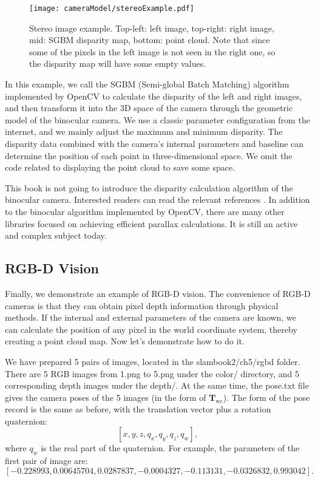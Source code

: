 \begin{figure}[!t]
    \centering
    \texttt{[image: cameraModel/stereoExample.pdf]}
    \caption{Stereo image example. Top-left: left image, top-right: right image, mid: SGBM disparity map, bottom: point cloud. Note that since some of the pixels in the left image is not seen in the right one, so the disparity map will have some empty values.}
    \label{fig:stereoExample}
\end{figure}

In this example, we call the SGBM (Semi-global Batch Matching) \textsuperscript{\cite{Hirschmuller2008}} algorithm implemented by OpenCV to calculate the disparity of the left and right images, and then transform it into the 3D space of the camera through the geometric model of the binocular camera. We use a classic parameter configuration from the internet, and we mainly adjust the maximum and minimum disparity. The disparity data combined with the camera's internal parameters and baseline can determine the position of each point in three-dimensional space. We omit the code related to displaying the point cloud to save some space.

This book is not going to introduce the disparity calculation algorithm of the binocular camera. Interested readers can read the relevant references \textsuperscript{\cite{Scharstein2002, Seitz2006}}. In addition to the binocular algorithm implemented by OpenCV, there are many other libraries focused on achieving efficient parallax calculations. It is still an active and complex subject today.

\subsection{RGB-D Vision}
\label{sec:join-point-cloud}
Finally, we demonstrate an example of RGB-D vision. The convenience of RGB-D cameras is that they can obtain pixel depth information through physical methods. If the internal and external parameters of the camera are known, we can calculate the position of any pixel in the world coordinate system, thereby creating a point cloud map. Now let's demonstrate how to do it.

We have prepared 5 pairs of images, located in the slambook2/ch5/rgbd folder. There are 5 RGB images from 1.png to 5.png under the color/ directory, and 5 corresponding depth images under the depth/. At the same time, the pose.txt file gives the camera poses of the 5 images (in the form of $ \mathbf{T}_\mathrm{wc} $). The form of the pose record is the same as before, with the translation vector plus a rotation quaternion:
\[
[x, y, z, q_x, q_y, q_z, q_w],
\]
where $q_w$ is the real part of the quaternion. For example, the parameters of the first pair of image are:
\[
[-0.228993, 0.00645704, 0.0287837, -0.0004327, -0.113131, -0.0326832, 0.993042].
\]


